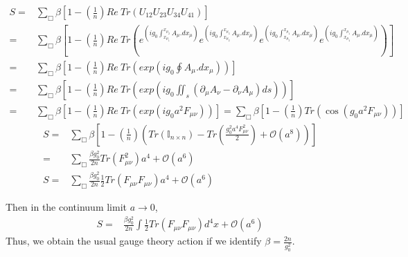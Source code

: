\documentclass{article}
\begin{document}
\begin{align}
    S=&\sum_\Box \beta\left[1-\left(\frac{1}{n}\right)Re~Tr\left(U_{12}U_{23}U_{34}U_{41}\right)\right]\\
    =&\sum_\Box \beta\left[1-\left(\frac{1}{n}\right)Re~Tr\left(e^{\left(ig_0\int_{x_\mu_1}^{x_\mu_2}A_{\mu}.dx_{\mu}\right)}e^{\left(ig_0\int_{x_\mu_2}^{x_\mu_3}A_{\mu}.dx_{\mu}\right)}e^{\left(ig_0\int_{x_\mu_3}^{x_\mu_4}A_{\mu}.dx_{\mu}\right)}e^{\left(ig_0\int_{x_\mu_4}^{x_\mu_1}A_{\mu}.dx_{\mu}\right)}\right)\right]\\
    =&\sum_\Box \beta\left[1-\left(\frac{1}{n}\right)Re~Tr\left(exp{\left(ig_0\oint A_{\mu}.dx_{\mu}\right)}\right)\right]\\
    =&\sum_\Box \beta\left[1-\left(\frac{1}{n}\right)Re~Tr\left(exp{\left(ig_0\iint_s (\partial_\mu A_\nu-\partial_\nu A_\mu)ds\right)}\right)\right]\\
    =&\sum_\Box \beta\left[1-\left(\frac{1}{n}\right)Re~Tr\left(exp{\left(ig_0a^2 F_{\mu\nu}\right)}\right)\right]=\sum_\Box \beta\left[1-\left(\frac{1}{n}\right)Tr\left(\cos{\left(g_0a^2 F_{\mu\nu}\right)}\right)\right]
\end{align}
\begin{align}
    S=&\sum_\Box \beta\left[1-\left(\frac{1}{n}\right)\left(Tr(\mathbb{I}_{n\times n})-Tr\left(\frac{g^2_0a^4F^2_{\mu\nu}}{2}\right)+\mathcal{O}(a^8)\right)\right]\\
    =&\sum_\Box \frac{\beta g^2_0}{2n}Tr(F^2_{\mu\nu})a^4+\mathcal{O}(a^6)\\
    S=&\sum_\Box \frac{\beta g^2_0}{2n}\frac{1}{2}Tr(F_{\mu\nu}F_{\mu\nu})a^4+\mathcal{O}(a^6)
\end{align}

Then in the continuum limit $a\longrightarrow0$,
 \begin{align}
     S=& \frac{\beta g^2_0}{2n}\int\frac{1}{2}Tr(F_{\mu\nu}F_{\mu\nu})d^4x+\mathcal{O}(a^6)
 \end{align}
Thus, we obtain the usual gauge theory action if we identify $\beta=\frac{2n}{g_0^2}$.
\end{document}
